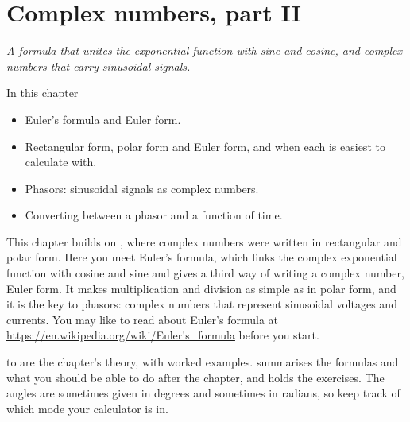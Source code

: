 
\chapter{Complex numbers, part II}
\label{c16:ch}

{\large\itshape A formula that unites the exponential function with sine and cosine, and complex
numbers that carry sinusoidal signals.\par}

\begin{chapterbox}{In this chapter}
\begin{itemize}
  \item Euler's formula and Euler form.
  \item Rectangular form, polar form and Euler form, and when each is easiest to calculate with.
  \item Phasors: sinusoidal signals as complex numbers.
  \item Converting between a phasor and a function of time.
\end{itemize}
\end{chapterbox}

This chapter builds on , where complex numbers were written in rectangular and polar
form. Here you meet Euler's formula, which links the complex exponential function with cosine and
sine and gives a third way of writing a complex number, Euler form. It makes multiplication and
division as simple as in polar form, and it is the key to phasors: complex numbers that represent
sinusoidal voltages and currents. You may like to read about Euler's formula at
\url{https://en.wikipedia.org/wiki/Euler's_formula} before you start.

 to  are the chapter's theory, with worked
examples.  summarises the formulas and what you should be able to
do after the chapter, and  holds the exercises. The angles are sometimes
given in degrees and sometimes in radians, so keep track of which mode your calculator is in.




